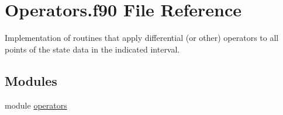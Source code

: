 \hypertarget{Operators_8f90}{}\section{Operators.\+f90 File Reference}
\label{Operators_8f90}


Implementation of routines that apply differential (or other) operators to all points of the state data in the indicated interval.  


\subsection*{Modules}
\begin{DoxyCompactItemize}
\item 
module \hyperlink{namespaceoperators}{operators}
\end{DoxyCompactItemize}
